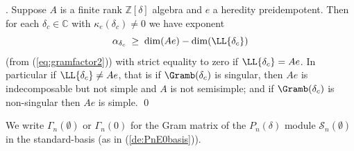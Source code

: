 \documentclass[reqno,10pt,a4paper]{amsart}
\newcommand{\C}{\mathbb{C}}
\newcommand{\Z}{\mathbb{Z}}
\newcommand{\beq}{\begin{equation}}
\newcommand{\eq}{\end{equation}}
\newcommand{\blue}[1]{\textcolor{blue}{#1}}
\newcommand{\ca}[1]{\blue{#1}}
\newcommand{\Gram}{\Gamma}
\begin{document}
. 
Suppose $A$ is a finite rank $\Z[\delta]$ algebra and $e$ a heredity preidempotent.
Then for each $\delta_c \in \C$ with $\kappa_e(\delta_c) \neq 0$ we have 
exponent 
\beq  \label{eq:alphabound2}
\alpha_{\delta_c}   \; \geq \;  \dim(Ae) - \dim(\LL{\delta_c})     
\eq
(from (\ref{eq:gramfactor2}))
with strict equality to zero if $ \LL{\delta_c} = Ae $.
%
\label{pr:hid22}
In particular 
if $ \LL{\delta_c} \neq Ae $,
that is if $\Gramb(\delta_c)$ is singular, then $Ae$ is 
indecomposable but 
not simple and $A$ is not semisimple;
and 
if   $\Gramb(\delta_c)$ is non-singular then $Ae$ is simple. 
\qed 







\medskip 

\mdef We write $\Gram_n(\emptyset)$ 
or $\Gram_n(0)$ 
for the Gram matrix 
of the $P^{}_n(\delta)$ %
module   $\mathcal{S}_n(\emptyset)$ 
in the   {standard-basis (as in (\ref{de:PnE0basis}))}.
\end{document}
